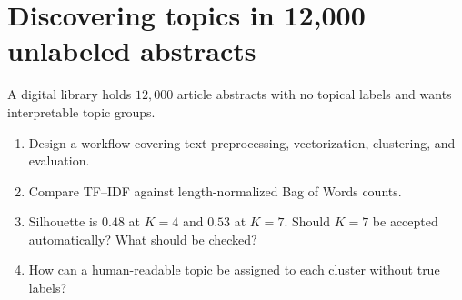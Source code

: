\section{Discovering topics in 12,000 unlabeled abstracts}
\label{sec:ex13}
\begin{problem}
A digital library holds $12{,}000$ article abstracts with no topical labels and wants interpretable topic groups.
\begin{enumerate}[label=\textbf{(\alph*)}]
\item Design a workflow covering text preprocessing, vectorization, clustering, and evaluation.
\item Compare TF--IDF against length-normalized Bag of Words counts.
\item Silhouette is $0.48$ at $K=4$ and $0.53$ at $K=7$. Should $K=7$ be accepted automatically? What should be checked?
\item How can a human-readable topic be assigned to each cluster without true labels?
\end{enumerate}
\end{problem}


